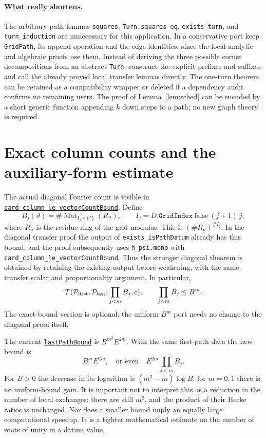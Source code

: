 \documentclass[11pt]{article}
\newcommand{\Pth}{\mathcal P}
\newcommand{\Tr}{\mathcal T}
\newcommand{\src}[2]{\href{https://github.com/VladimirReshetnikov/ProveIt/blob/main/Analysis/GeneralizedRiemannHypothesis/Lean/grh/src/#1}{#2}}
\newcommand{\code}[1]{\texttt{#1}}
\begin{document}
\paragraph{What really shortens.} The arbitrary-path lemmas \code{squares}, \code{Turn.squares\_eq}, \code{exists\_turn}, and \code{turn\_induction} are unnecessary for this application. In a conservative port keep \code{GridPath}, its append operation and the edge identities, since the local analytic and algebraic proofs use them. Instead of deriving the three possible corner decompositions from an abstract \code{Turn}, construct the explicit prefixes and suffixes and call the already proved local transfer lemmas directly. The one-turn theorem can be retained as a compatibility wrapper or deleted if a dependency audit confirms no remaining users. The proof of Lemma~\ref{lem:sched} can be encoded by a short generic function appending $k$ down steps to a path; no new graph theory is required.

\section{Exact column counts and the auxiliary-form estimate}
The actual diagonal Fourier count is visible in \src{New/Determinant/AuxiliaryForms/DiagonalTurns.lean\#L486}{\code{card\_column\_le\_vectorCountBound}}. Define
\[
 B_j(\vartheta)=\#\operatorname{Mat}_{I_j\times\{*\}}(R_\vartheta),\qquad
 I_j=D.\code{GridIndex}\ \mathrm{false}\ (j+1)\ j,
\]
where $R_\vartheta$ is the residue ring of the grid modulus. This is $(\# R_\vartheta)^{\# I_j}$. In the diagonal transfer proof the output of \code{exists\_isPathDatum} already has this bound, and the proof subsequently uses \code{h\_psi.mono} with \code{card\_column\_le\_vectorCountBound}. Thus the stronger diagonal theorem is obtained by retaining the existing output before weakening, with the same transfer scalar and proportionality argument. In particular,
\[
 \Tr(\Pth_{\rm first},\Pth_{\rm last};\prod_{j<m}B_j,c),\qquad
 \prod_{j<m}B_j\le B^m.
\]
The exact-bound version is optional: the uniform $B^m$ port needs no change to the diagonal proof itself.

The current \src{New/Determinant/AuxiliaryForms/SpanningForms.lean\#L63}{\code{lastPathBound}} is $B^{m^2}E^{2m}$. With the same first-path data the new bound is
\[
 B^m E^{2m},\quad\text{or even}\quad E^{2m}\prod_{j<m} B_j.
\]
For $B>0$ the decrease in its logarithm is $(m^2-m)\log B$; for $m=0,1$ there is no uniform-bound gain. It is important not to interpret this as a reduction in the number of local exchanges: there are still $m^2$, and the product of their Hecke ratios is unchanged. Nor does a smaller bound imply an equally large computational speedup. It is a tighter mathematical estimate on the number of roots of unity in a datum value.
\end{document}
